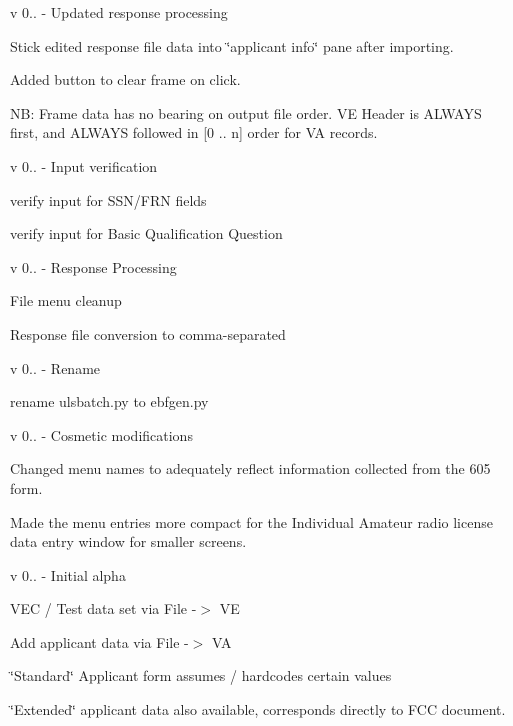 v 0.. -\/ Updated response processing
\begin{DoxyItemize}
\item Stick edited response file data into \char`\"{}applicant info\char`\"{} pane after importing.
\item Added button to clear frame on click.
\item NB\+: Frame data has no bearing on output file order. VE Header is A\+L\+W\+A\+YS first, and A\+L\+W\+A\+YS followed in \mbox{[}0 .. n\mbox{]} order for VA records.
\end{DoxyItemize}

v 0.. -\/ Input verification
\begin{DoxyItemize}
\item verify input for S\+S\+N/\+F\+RN fields
\item verify input for Basic Qualification Question
\end{DoxyItemize}

v 0.. -\/ Response Processing
\begin{DoxyItemize}
\item File menu cleanup
\item Response file conversion to comma-\/separated
\end{DoxyItemize}

v 0.. -\/ Rename
\begin{DoxyItemize}
\item rename ulsbatch.\+py to ebfgen.\+py
\end{DoxyItemize}

v 0.. -\/ Cosmetic modifications
\begin{DoxyItemize}
\item Changed menu names to adequately reflect information collected from the 605 form.
\item Made the menu entries more compact for the Individual Amateur radio license data entry window for smaller screens.
\end{DoxyItemize}

v 0.. -\/ Initial alpha
\begin{DoxyItemize}
\item V\+EC / Test data set via File -\/$>$ VE
\item Add applicant data via File -\/$>$ VA
\begin{DoxyItemize}
\item \char`\"{}\+Standard\char`\"{} Applicant form assumes / hardcodes certain values
\item \char`\"{}\+Extended\char`\"{} applicant data also available, corresponds directly to F\+CC document. 
\end{DoxyItemize}
\end{DoxyItemize}